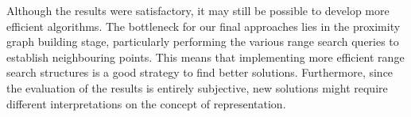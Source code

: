 \begin{change}
Although the results were satisfactory, it may still be possible to develop more efficient algorithms. The bottleneck for our final approaches lies in the proximity graph building stage, particularly performing the various range search queries to establish neighbouring points. This means that implementing more efficient range search structures is a good strategy to find better solutions. Furthermore, since the evaluation of the results is entirely subjective, new solutions might require different interpretations on the concept of representation.
\end{change}
